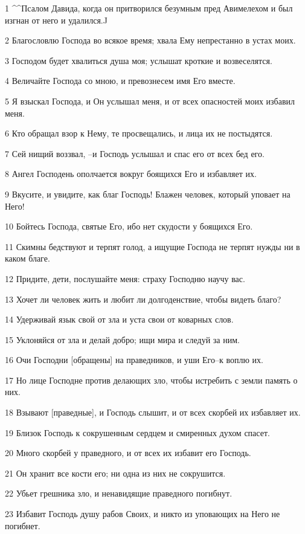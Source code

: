 \par 1 ^^Псалом Давида, когда он притворился безумным пред Авимелехом и был изгнан от него и удалился.^^
\par 2 Благословлю Господа во всякое время; хвала Ему непрестанно в устах моих.
\par 3 Господом будет хвалиться душа моя; услышат кроткие и возвеселятся.
\par 4 Величайте Господа со мною, и превознесем имя Его вместе.
\par 5 Я взыскал Господа, и Он услышал меня, и от всех опасностей моих избавил меня.
\par 6 Кто обращал взор к Нему, те просвещались, и лица их не постыдятся.
\par 7 Сей нищий воззвал, --и Господь услышал и спас его от всех бед его.
\par 8 Ангел Господень ополчается вокруг боящихся Его и избавляет их.
\par 9 Вкусите, и увидите, как благ Господь! Блажен человек, который уповает на Него!
\par 10 Бойтесь Господа, святые Его, ибо нет скудости у боящихся Его.
\par 11 Скимны бедствуют и терпят голод, а ищущие Господа не терпят нужды ни в каком благе.
\par 12 Придите, дети, послушайте меня: страху Господню научу вас.
\par 13 Хочет ли человек жить и любит ли долгоденствие, чтобы видеть благо?
\par 14 Удерживай язык свой от зла и уста свои от коварных слов.
\par 15 Уклоняйся от зла и делай добро; ищи мира и следуй за ним.
\par 16 Очи Господни [обращены] на праведников, и уши Его--к воплю их.
\par 17 Но лице Господне против делающих зло, чтобы истребить с земли память о них.
\par 18 Взывают [праведные], и Господь слышит, и от всех скорбей их избавляет их.
\par 19 Близок Господь к сокрушенным сердцем и смиренных духом спасет.
\par 20 Много скорбей у праведного, и от всех их избавит его Господь.
\par 21 Он хранит все кости его; ни одна из них не сокрушится.
\par 22 Убьет грешника зло, и ненавидящие праведного погибнут.
\par 23 Избавит Господь душу рабов Своих, и никто из уповающих на Него не погибнет.

